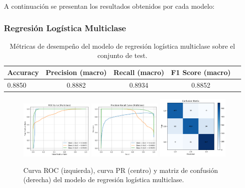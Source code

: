\documentclass[11pt]{article}
\begin{document}
A continuación se presentan los resultados obtenidos por cada modelo:

\subsubsection*{Regresión Logística Multiclase}
\begin{table}[H]
    \centering
    \begin{tabular}{lcccc}
        \toprule
        \textbf{Accuracy} & \textbf{Precision (macro)} & \textbf{Recall (macro)} & \textbf{F1 Score (macro)} \\
        \midrule
        0.8850 & 0.8882 & 0.8934 & 0.8852 \\
        \bottomrule
    \end{tabular}
    \caption{Métricas de desempeño del modelo de regresión logística multiclase sobre el conjunto de test.}
    \label{tab:logistic_scores}
\end{table}

\begin{figure}[H]
    \centering
    \includegraphics[width=0.32\textwidth]{figures/logistic_roc.png}
    \hfill
    \includegraphics[width=0.32\textwidth]{figures/logistic_pr.png}
    \hfill
    \includegraphics[width=0.32\textwidth]{figures/logistic_conf_matrix.png}
    \caption{Curva ROC (izquierda), curva PR (centro) y matriz de confusión (derecha) del modelo de regresión logística multiclase.}
    \label{fig:logistic_figures}
\end{figure}
\end{document}
